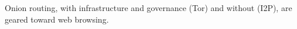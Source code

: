 Onion routing, with infrastructure and governance (Tor) and without (I2P), are geared toward web browsing. 





